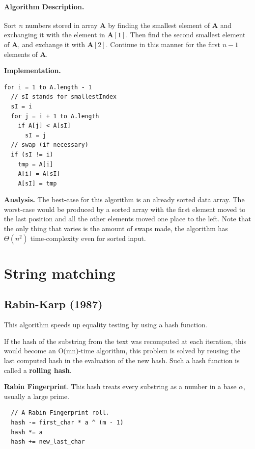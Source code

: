 \documentclass[oneside]{book}
\begin{document}
\paragraph{Algorithm Description.} Sort \(n\) numbers stored in array
\(\mathbf{A}\) by finding the smallest element of \(\mathbf{A}\) and exchanging
it with the element in \(\mathbf{A}[1]\). Then find the second smallest element
of \(\mathbf{A}\), and exchange it with \(\mathbf{A}[2]\). Continue in this
manner for the first \(n - 1\) elements of \(\mathbf{A}\).

\textbf{Implementation.}

\begin{lstlisting}
for i = 1 to A.length - 1
  // sI stands for smallestIndex
  sI = i
  for j = i + 1 to A.length
    if A[j] < A[sI]
      sI = j
  // swap (if necessary)
  if (sI != i)
    tmp = A[i]
    A[i] = A[sI]
    A[sI] = tmp
\end{lstlisting}

\textbf{Analysis.} The best-case for this algorithm is an already sorted data
array. The worst-case would be produced by a sorted array with the first element
moved to the last position and all the other elements moved one place to the
left. Note that the only thing that varies is the amount of swaps made, the
algorithm has \(\Theta(n^2)\) time-complexity even for sorted input.

\section{String matching}
\subsection{Rabin-Karp (1987)}
This algorithm speeds up equality testing by using a hash function.

If the hash of the substring from the text was recomputed at each iteration,
this would become an O(mn)-time algorithm, this problem is solved by reusing
the last computed hash in the evaluation of the new hash. Such a hash function
is called a \textbf{rolling hash}.

\textbf{Rabin Fingerprint}. This hash treats every substring as a number in a
base \(\alpha\), usually a large prime.

\begin{lstlisting}
  // A Rabin Fingerprint roll.
  hash -= first_char * a ^ (m - 1)
  hash *= a
  hash += new_last_char
\end{lstlisting}
\end{document}
